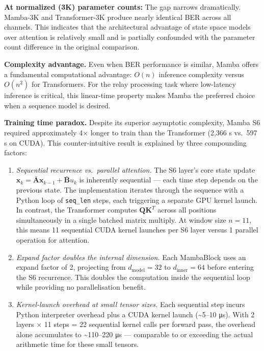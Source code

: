 \textbf{At normalized (3K) parameter counts:} The gap narrows dramatically. Mamba-3K and Transformer-3K produce nearly identical BER across all channels. This indicates that the architectural advantage of state space models over attention is relatively small and is partially confounded with the parameter count difference in the original comparison.

\textbf{Complexity advantage.} Even when BER performance is similar, Mamba offers a fundamental computational advantage: \(O(n)\) inference complexity versus \(O(n^2)\) for Transformers. For the relay processing task where low-latency inference is critical, this linear-time property makes Mamba the preferred choice when a sequence model is desired.

\textbf{Training time paradox.} Despite its superior asymptotic complexity, Mamba S6 required approximately 4× longer to train than the Transformer (2,366 s vs.~597 s on CUDA). This counter-intuitive result is explained by three compounding factors:

\begin{enumerate}
\def\labelenumi{\arabic{enumi}.}
\item
  \emph{Sequential recurrence vs.~parallel attention.} The S6 layer's core state update \(\mathbf{x}_k = \bar{\mathbf{A}} \mathbf{x}_{k-1} + \bar{\mathbf{B}} u_k\) is inherently sequential --- each time step depends on the previous state. The implementation iterates through the sequence with a Python loop of \texttt{seq\_len} steps, each triggering a separate GPU kernel launch. In contrast, the Transformer computes \(\mathbf{Q}\mathbf{K}^T\) across all positions simultaneously in a single batched matrix multiply. At window size \(n = 11\), this means 11 sequential CUDA kernel launches per S6 layer versus 1 parallel operation for attention.
\item
  \emph{Expand factor doubles the internal dimension.} Each MambaBlock uses an expand factor of 2, projecting from \(d_\text{model} = 32\) to \(d_\text{inner} = 64\) before entering the S6 recurrence. This doubles the computation inside the sequential loop while providing no parallelisation benefit.
\item
  \emph{Kernel-launch overhead at small tensor sizes.} Each sequential step incurs Python interpreter overhead plus a CUDA kernel launch (\textasciitilde5--10 μs). With 2 layers × 11 steps = 22 sequential kernel calls per forward pass, the overhead alone accumulates to \textasciitilde110--220 μs --- comparable to or exceeding the actual arithmetic time for these small tensors.
\end{enumerate}

